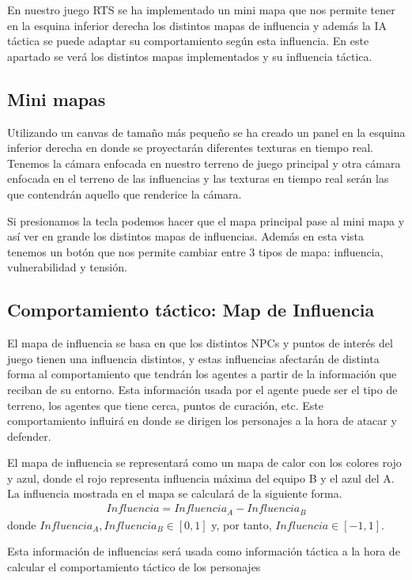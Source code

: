 En nuestro juego RTS se ha implementado un mini mapa que nos permite tener en la esquina inferior derecha los distintos mapas de influencia y además la IA táctica se puede adaptar su comportamiento según esta influencia. En este apartado se verá los distintos mapas implementados y su influencia táctica.

\subsection{Mini mapas}

Utilizando un canvas de tamaño más pequeño se ha creado un panel en la esquina inferior derecha en donde se proyectarán diferentes texturas en tiempo real. Tenemos la cámara enfocada en nuestro terreno de juego principal y otra cámara enfocada en el terreno de las influencias y las texturas en tiempo real serán las que contendrán aquello que renderice la cámara. 

Si presionamos la tecla  podemos hacer que el mapa principal pase al mini mapa y así ver en grande los distintos mapas de influencias.  Además en esta vista tenemos un botón que nos permite cambiar entre 3 tipos de mapa: influencia, vulnerabilidad y tensión. 


\subsection{Comportamiento táctico: Map de Influencia}
El mapa de influencia se basa en que los distintos NPCs y puntos de interés del juego tienen una influencia distintos, y estas influencias afectarán de distinta forma al comportamiento que tendrán los agentes a partir de la información que reciban de su entorno. Esta información usada por el agente puede ser el tipo de terreno, los agentes que tiene cerca, puntos de curación, etc. Este comportamiento influirá en donde se dirigen los personajes a la hora de atacar y defender. 

El mapa de influencia se representará como un mapa de calor con los colores rojo y azul, donde el rojo representa influencia máxima del equipo B y el azul del A. La influencia mostrada en el mapa se calculará de la siguiente forma.
\begin{gather*}
    Influencia = Influencia_A - Influencia_B
\end{gather*}
donde $Influencia_A, Influencia_B \in [0,1]$ y, por tanto, $Influencia \in [-1, 1]$.


Esta información de influencias será usada como información táctica a la hora de calcular el comportamiento táctico de los personajes